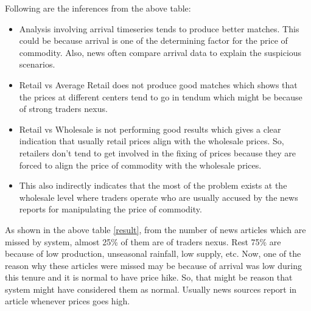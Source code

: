 Following are the inferences from the above table:
\begin{itemize}
 \item Analysis involving arrival timeseries tends to produce better matches. This could be because arrival is one of the determining factor for the price of commodity. Also, news often compare arrival data to explain the suspicious scenarios.
 \item Retail vs Average Retail does not produce good matches which shows that the prices at different centers tend to go in tendum which might be because of strong traders nexus.
 \item Retail vs Wholesale is not performing good results which gives a clear indication that usually retail prices align with the wholesale prices. So, retailers don't tend to get involved in the fixing of prices because they are forced to align the price of commodity with the wholesale prices.
 \item This also indirectly indicates that the most of the problem exists at the wholesale level where traders operate who are usually accused by the news reports for manipulating the price of commodity.
\end{itemize}

As shown in the above table \ref{result}, from the number of news articles which are missed by system, almost 25\% of them are of traders nexus. Rest 75\% are because of low production, unseasonal rainfall, low supply, etc. Now, one of the reason why these articles were missed may be because of arrival was low during this tenure and it is normal to have price hike. So, that might be reason that system might have considered them as normal. Usually news sources report in article whenever prices goes high.


